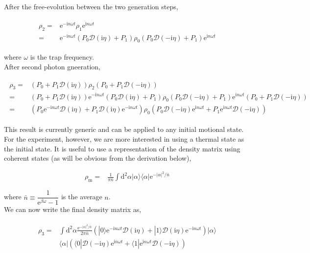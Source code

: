 \documentclass[10pt,fleqn]{article}
\newcommand{\ud}{\mathrm{d}}
\newcommand{\ue}{\mathrm{e}}
\newcommand{\ui}{\mathrm{i}}
\newcommand{\eqar}[1]
{
  \begin{align}
    #1
  \end{align}
}
\newcommand{\paren}[1]{{\left({#1}\right)}}
\newcommand{\abs}[1]{{\left|{#1}\right|}}
\begin{document}
After the free-evolution between the two generation steps,
\eqar{
  \begin{split}
    \rho_2=&\ue^{-\ui n\omega t}\rho_1\ue^{\ui n\omega t}\\
    =&\ue^{-\ui n\omega t}\paren{P_{0}\mathcal{D}(\ui\eta)+P_{1}}\rho_0\paren{P_{0}\mathcal{D}(-\ui\eta)+P_{1}}\ue^{\ui n\omega t}
  \end{split}
}
where $\omega$ is the trap frequency.\\

After second photon gneeration,
\eqar{
  \begin{split}
    \rho_3=&\paren{P_{0}+P_{1}\mathcal{D}(\ui\eta)}\rho_2\paren{P_{0}+P_{1}\mathcal{D}(-\ui\eta)}\\
    =&\paren{P_{0}+P_{1}\mathcal{D}(\ui\eta)}\ue^{-\ui n\omega t}\paren{P_{0}\mathcal{D}(\ui\eta)+P_{1}}\rho_0\paren{P_{0}\mathcal{D}(-\ui\eta)+P_{1}}\ue^{\ui n\omega t}\paren{P_{0}+P_{1}\mathcal{D}(-\ui\eta)}\\
    =&\paren{P_{0}\ue^{-\ui n\omega t}\mathcal{D}(\ui\eta)+P_{1}\mathcal{D}(\ui\eta)\ue^{-\ui n\omega t}}\rho_0\paren{P_{0}\mathcal{D}(-\ui\eta)\ue^{\ui n\omega t}+P_{1}\ue^{\ui n\omega t}\mathcal{D}(-\ui\eta)}
  \end{split}
}
This result is currently generic and can be applied to any initial motional state.
For the experiment, however, we are more interested in using a thermal state
as the initial state. It is useful to use a representation of the density matrix
using coherent states (as will be obvious from the derivation below),

\eqar{
  \rho_{\mathrm{m}}=&\frac{1}{\pi {\bar n}}\int\ud^2\alpha |\alpha\rangle\langle\alpha|\ue^{-\abs{\alpha}^2/{\bar n}}
}
where ${\bar n}\equiv\dfrac{1}{\ue^{\beta\omega}-1}$ is the average $n$.\\

We can now write the final density matrix as,
\eqar{
  \begin{split}
    \rho_3=
    &\int\ud^2\alpha \frac{\ue^{-\abs{\alpha}^2/{\bar n}}}{2\pi {\bar n}}
      \paren{|0\rangle\ue^{-\ui n\omega t}\mathcal{D}(\ui\eta)+|1\rangle\mathcal{D}(\ui\eta)\ue^{-\ui n\omega t}}|\alpha\rangle\\
    &\langle\alpha|\paren{\langle0|\mathcal{D}(-\ui\eta)\ue^{\ui n\omega t}+\langle1|\ue^{\ui n\omega t}\mathcal{D}(-\ui\eta)}
  \end{split}
}
\end{document}
